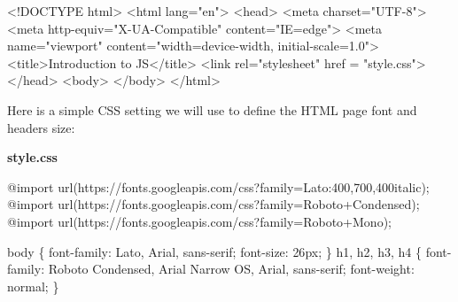 \documentclass[
  letterpaper,
  DIV=11,
  numbers=noendperiod]{scrreprt}
\newenvironment{Shaded}{\begin{snugshade}}{\end{snugshade}}
\newcommand{\DataTypeTok}[1]{\textcolor[rgb]{0.68,0.00,0.00}{#1}}
\newcommand{\DecValTok}[1]{\textcolor[rgb]{0.68,0.00,0.00}{#1}}
\newcommand{\ErrorTok}[1]{\textcolor[rgb]{0.68,0.00,0.00}{#1}}
\newcommand{\FunctionTok}[1]{\textcolor[rgb]{0.28,0.35,0.67}{#1}}
\newcommand{\ImportTok}[1]{\textcolor[rgb]{0.00,0.46,0.62}{#1}}
\newcommand{\KeywordTok}[1]{\textcolor[rgb]{0.00,0.23,0.31}{#1}}
\newcommand{\NormalTok}[1]{\textcolor[rgb]{0.00,0.23,0.31}{#1}}
\newcommand{\OperatorTok}[1]{\textcolor[rgb]{0.37,0.37,0.37}{#1}}
\newcommand{\OtherTok}[1]{\textcolor[rgb]{0.00,0.23,0.31}{#1}}
\newcommand{\StringTok}[1]{\textcolor[rgb]{0.13,0.47,0.30}{#1}}
\begin{document}
\begin{Shaded}
\begin{Highlighting}[]
\DataTypeTok{\textless{}!DOCTYPE }\NormalTok{html}\DataTypeTok{\textgreater{}}
\KeywordTok{\textless{}html} \ErrorTok{lang}\OtherTok{=}\StringTok{"en"}\KeywordTok{\textgreater{}}
\KeywordTok{\textless{}head\textgreater{}}
    \KeywordTok{\textless{}meta} \ErrorTok{charset}\OtherTok{=}\StringTok{"UTF{-}8"}\KeywordTok{\textgreater{}}
    \KeywordTok{\textless{}meta} \ErrorTok{http{-}equiv}\OtherTok{=}\StringTok{"X{-}UA{-}Compatible"} \ErrorTok{content}\OtherTok{=}\StringTok{"IE=edge"}\KeywordTok{\textgreater{}}
    \KeywordTok{\textless{}meta} \ErrorTok{name}\OtherTok{=}\StringTok{"viewport"} \ErrorTok{content}\OtherTok{=}\StringTok{"width=device{-}width, initial{-}scale=1.0"}\KeywordTok{\textgreater{}}
    \KeywordTok{\textless{}title\textgreater{}}\NormalTok{Introduction to JS}\KeywordTok{\textless{}/title\textgreater{}}
    \KeywordTok{\textless{}link} \ErrorTok{rel}\OtherTok{=}\StringTok{"stylesheet"} \ErrorTok{href} \OtherTok{=} \StringTok{"style.css"}\KeywordTok{\textgreater{}}
\KeywordTok{\textless{}/head\textgreater{}}
\KeywordTok{\textless{}body\textgreater{}}
\KeywordTok{\textless{}/body\textgreater{}}
\KeywordTok{\textless{}/html\textgreater{}}
\end{Highlighting}
\end{Shaded}

Here is a simple CSS setting we will use to define the HTML page font
and headers size:

\textbf{style.css}

\begin{Shaded}
\begin{Highlighting}[]
\ImportTok{@import} \FunctionTok{url(}\StringTok{https://fonts.googleapis.com/css?family=Lato:400,700,400italic}\FunctionTok{)}\OperatorTok{;}
\ImportTok{@import} \FunctionTok{url(}\StringTok{https://fonts.googleapis.com/css?family=Roboto+Condensed}\FunctionTok{)}\OperatorTok{;}
\ImportTok{@import} \FunctionTok{url(}\StringTok{https://fonts.googleapis.com/css?family=Roboto+Mono}\FunctionTok{)}\OperatorTok{;}

\NormalTok{body \{ }
  \KeywordTok{font{-}family}\NormalTok{: }\StringTok{\textquotesingle{}Lato\textquotesingle{}}\OperatorTok{,}\NormalTok{ Arial}\OperatorTok{,} \DecValTok{sans{-}serif}\OperatorTok{;}
  \KeywordTok{font{-}size}\NormalTok{: }\DecValTok{26}\DataTypeTok{px}\OperatorTok{;}
\NormalTok{\}}
\NormalTok{h1}\OperatorTok{,}\NormalTok{ h2}\OperatorTok{,}\NormalTok{ h3}\OperatorTok{,}\NormalTok{ h4 \{}
  \KeywordTok{font{-}family}\NormalTok{: }\StringTok{\textquotesingle{}Roboto Condensed\textquotesingle{}}\OperatorTok{,} \StringTok{\textquotesingle{}Arial Narrow OS\textquotesingle{}}\OperatorTok{,}\NormalTok{ Arial}\OperatorTok{,} \DecValTok{sans{-}serif}\OperatorTok{;}
  \KeywordTok{font{-}weight}\NormalTok{: }\DecValTok{normal}\OperatorTok{;}
\NormalTok{\}}
\end{Highlighting}
\end{Shaded}
\end{document}
